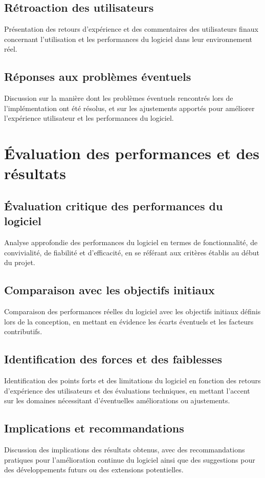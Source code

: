 \subsection{Rétroaction des utilisateurs}
Présentation des retours d'expérience et des commentaires des utilisateurs finaux concernant l'utilisation et les performances du logiciel dans leur environnement réel.

\subsection{Réponses aux problèmes éventuels}
Discussion sur la manière dont les problèmes éventuels rencontrés lors de l'implémentation ont été résolus, et sur les ajustements apportés pour améliorer l'expérience utilisateur et les performances du logiciel.

\section{Évaluation des performances et des résultats}
\subsection{Évaluation critique des performances du logiciel}
Analyse approfondie des performances du logiciel en termes de fonctionnalité, de convivialité, de fiabilité et d'efficacité, en se référant aux critères établis au début du projet.

\subsection{Comparaison avec les objectifs initiaux}
Comparaison des performances réelles du logiciel avec les objectifs initiaux définis lors de la conception, en mettant en évidence les écarts éventuels et les facteurs contributifs.

\subsection{Identification des forces et des faiblesses}
Identification des points forts et des limitations du logiciel en fonction des retours d'expérience des utilisateurs et des évaluations techniques, en mettant l'accent sur les domaines nécessitant d'éventuelles améliorations ou ajustements.

\subsection{Implications et recommandations}
Discussion des implications des résultats obtenus, avec des recommandations pratiques pour l'amélioration continue du logiciel ainsi que des suggestions pour des développements futurs ou des extensions potentielles.

